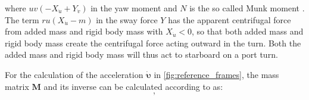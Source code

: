 where $u v \left(- X_{\dot{u}} + Y_{\dot{v}}\right)$ in the yaw moment and $N$ is the so called Munk moment \citep{fossenHandbookMarineCraft2011}. The term $r u \left(X_{\dot{u}} - m\right)$ in the sway force $Y$ has the apparent centrifugal force from added mass and rigid body mass with $X_{\dot{u}}<0$, so that both added mass and rigid body mass create the centrifugal force acting outward in the turn. Both the added mass and rigid body mass will thus act to starboard on a port turn.

For the calculation of the acceleration $\pmb{\bm{\dot{\upsilon}}}$ in \autoref{fig:reference_frames}, the mass matrix $\mathbf{M}$ and its inverse can be calculated according to \citet{fossenHandbookMarineCraft2011} as: 
\begin{equation}
    \label{eq:M_expanded}
    ,
\end{equation}
%     
%     

